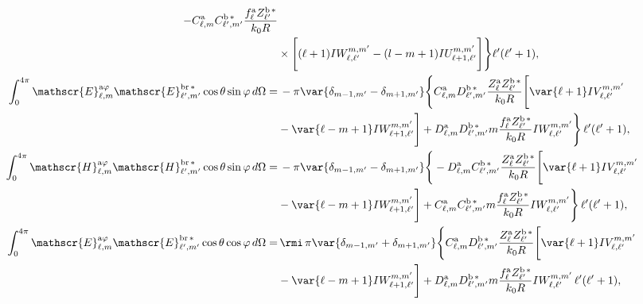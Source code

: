 \begin{align}
%
-C_{\ell, m}^{\rm a}C_{\ell^{\prime}, m^{\prime}}^{\rm b \, *} \frac{f_{\ell}^{\rm a}Z_{\ell^{\prime}}^{\rm b \, *}}{k_0 R} \nonumber \\
%
& \times \Bigg[ (\ell+1) IW_{\ell, \ell^{\prime}}^{m, m^{\prime}} 
%
-(l-m+1) IU_{\ell + 1, \ell^{\prime}}^{m, m^{\prime}} \Bigg] \Bigg\}\ell^{\prime}(\ell^{\prime}+1),\\
%
%
%
%
\int_0^{4\pi}\mathscr{E}_{\ell, m}^{\text{a}\varphi}\mathscr{E}_{\ell^{\prime}, m^{\prime}}^{\text{br}\,*}\cos\theta\sin\varphi \, d\Omega
%
 =& \, - \pi \var{ \delta_{m-1, m^{\prime}} - \delta_{m+1, m^{\prime}} } \Bigg\{ C_{\ell, m}^{\rm a} D_{\ell^{\prime}, m^{\prime}}^{\rm b \, *} \frac{Z_{\ell}^{\rm a} Z_{\ell^{\prime}}^{\rm b \, *}}{k_0 R} \Bigg[\var{\ell +1} IV_{\ell, \ell^{\prime}}^{m, m^{\prime}} \nonumber \\ 
% 
&-\var{\ell - m +1} IW_{\ell + 1, \ell^{\prime}}^{m, m^{\prime}} \Bigg]
%
 + D_{\ell, m}^{\rm a} D_{\ell^{\prime}, m^{\prime}}^{\rm b \, *} m \frac{f_{\ell}^{\rm a} Z_{\ell^{\prime}}^{\rm b\, *}}{k_0 R} IW_{\ell, \ell^{\prime}}^{m, m^{\prime}} \Bigg\} \, \ell^{\prime}(\ell^{\prime}+1),  \\
%
%
\int_0^{4\pi}\mathscr{H}_{\ell, m}^{\text{a}\varphi}\mathscr{H}_{\ell^{\prime}, m^{\prime}}^{\text{br}\,*}\cos\theta\sin\varphi \, d\Omega
%
 =& \, - \pi \var{ \delta_{m-1, m^{\prime}} - \delta_{m+1, m^{\prime}} } \Bigg\{ -D_{\ell, m}^{\rm a} C_{\ell^{\prime}, m^{\prime}}^{\rm b \, *} \frac{Z_{\ell}^{\rm a} Z_{\ell^{\prime}}^{\rm b \, *}}{k_0 R} \Bigg[\var{\ell +1} IV_{\ell, \ell^{\prime}}^{m, m^{\prime}} \nonumber \\ 
% 
&-\var{\ell - m +1} IW_{\ell + 1, \ell^{\prime}}^{m, m^{\prime}} \Bigg]
%
 + C_{\ell, m}^{\rm a} C_{\ell^{\prime}, m^{\prime}}^{\rm b \, *} m \frac{f_{\ell}^{\rm a} Z_{\ell^{\prime}}^{\rm b\, *}}{k_0 R} IW_{\ell, \ell^{\prime}}^{m, m^{\prime}} \Bigg\} \, \ell^{\prime}(\ell^{\prime}+1),  \\
% 
%
%
%
\int_0^{4\pi}\mathscr{E}_{\ell, m}^{\text{a}\varphi}\mathscr{E}_{\ell^{\prime}, m^{\prime}}^{\text{br}\,*}\cos\theta\cos\varphi \, d\Omega
%
 =& \, \rmi \, \pi \var{ \delta_{m-1, m^{\prime}} + \delta_{m+1, m^{\prime}} } \Bigg\{ C_{\ell, m}^{\rm a} D_{\ell^{\prime}, m^{\prime}}^{\rm b \, *} \frac{Z_{\ell}^{\rm a} Z_{\ell^{\prime}}^{\rm b \, *}}{k_0 R} \Bigg[\var{\ell +1} IV_{\ell, \ell^{\prime}}^{m, m^{\prime}} \nonumber \\ 
% 
&-\var{\ell - m +1} IW_{\ell + 1, \ell^{\prime}}^{m, m^{\prime}} \Bigg]
%
 + D_{\ell, m}^{\rm a} D_{\ell^{\prime}, m^{\prime}}^{\rm b \, *} m \frac{f_{\ell}^{\rm a} Z_{\ell^{\prime}}^{\rm b\, *}}{k_0 R} IW_{\ell, \ell^{\prime}}^{m, m^{\prime}} \, \ell^{\prime}(\ell^{\prime}+1),\\

\end{align}
